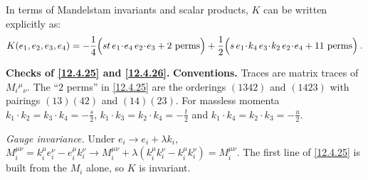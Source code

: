 In terms of Mandelstam invariants and scalar products, $K$ can be written explicitly as:
\begin{equation}
	K(e_{1},e_{2},e_{3},e_{4}) = -\frac{1}{4}\Bigl(st\,e_{1}\!\cdot\!e_{4}\,e_{2}\!\cdot\!e_{3} + 2\text{ perms}\Bigr) + \frac{1}{2}\Bigl(s\,e_{1}\!\cdot\!k_{4}\,e_{3}\!\cdot\!k_{2}\,e_{2}\!\cdot\!e_{4} + 11\text{ perms}\Bigr) \:. \label{12.4.26}
\end{equation}
\begin{tcolorbox}[breakable]
	\begin{remark}
		\textbf{Checks of \eqref{12.4.25} and \eqref{12.4.26}.} \textbf{Conventions.} Traces are matrix traces of $M_{i}{}^{\mu}{}_{\nu}$. The ``$2$ perms'' in \eqref{12.4.25} are the orderings $(1342)$ and $(1423)$ with pairings $(13)(42)$ and $(14)(23)$. For massless momenta $k_{1}\cdot k_{2}=k_{3}\cdot k_{4}=-\frac s2$, $k_{1}\cdot k_{3}=k_{2}\cdot k_{4}=-\frac t2$ and $k_{1}\cdot k_{4}=k_{2}\cdot k_{3}=-\frac u2$.

		\emph{Gauge invariance.} Under $e_{i}\to e_{i}+\lambda k_{i}$, $M_{i}^{\mu\nu}=k_{i}^{\mu}e_{i}^{\nu}-e_{i}^{\mu}k_{i}^{\nu}\to M_{i}^{\mu\nu}+\lambda(k_{i}^{\mu}k_{i}^{\nu}-k_{i}^{\mu}k_{i}^{\nu})=M_{i}^{\mu\nu}$. The first line of \eqref{12.4.25} is built from the $M_{i}$ alone, so $K$ is invariant.


\end{remark}
\end{tcolorbox}

